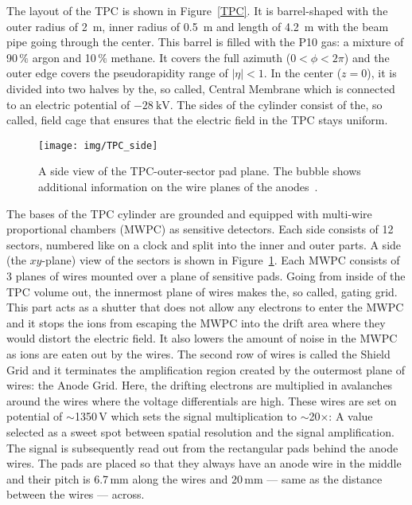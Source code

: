 The layout of the TPC is shown in Figure~\ref{TPC}. It is barrel-shaped with the outer radius of \SI{2}{\metre}, inner radius of \SI{0.5}{\metre} and length of \SI{4.2}{\metre}
with the beam pipe going through the center. This barrel is filled with the P10 gas: a mixture of 90$\,\%$ argon and 10$\,\%$ methane. It covers the full azimuth ($0 < \phi < 2\pi$) and the outer edge covers the
pseudorapidity range of $|\eta| < 1$. 
In the center ($z = 0$), it is divided into two halves by the, so called, Central Membrane which is connected to an electric 
potential of $-\SI{28}{\kilo\volt}$\@.  The sides of the cylinder consist of the, so called, field cage that ensures that the electric field in the TPC stays uniform.

\begin{figure}[htb]
\begin{center}
 \texttt{[image: img/TPC\_side]}\\
\end{center}
\caption{\label{TPCside}A side view of the TPC-outer-sector pad plane. The bubble shows additional information on the wire planes of the anodes~\cite{TpcNim}.}
\end{figure}

The bases of the TPC cylinder are grounded and equipped with multi-wire proportional chambers
(MWPC) as sensitive detectors. Each side consists of 12 sectors, numbered like on a clock and split into 
the inner and outer parts. A side (the $xy$-plane) view of the sectors is shown in Figure~\ref{TPCside}\@. Each MWPC consists of 3 planes of wires mounted over a plane of sensitive pads. Going from inside of the TPC volume out, the innermost plane of wires makes the, so called, gating grid. This part acts as a shutter that does not allow any electrons to enter the MWPC and it stops the ions from escaping the MWPC into the drift area where they would distort the electric field. It also lowers the amount of noise in the MWPC as ions are eaten out by the wires. The second row of wires is called the Shield Grid and it terminates the amplification region created by the outermost plane of wires: the Anode Grid. Here, the drifting electrons are multiplied in avalanches around the wires where the voltage differentials are high. These wires are set on potential of $\sim$1350$\,$V which sets the signal multiplication to $\sim$20$\times$\@: A value selected as a sweet spot between spatial resolution and the signal amplification. The signal is subsequently read out from the rectangular pads behind the anode wires. The pads are placed so that they always have an anode wire in the middle and their pitch is 6.7$\,$mm along the wires and 20$\,$mm --- same as the distance between the wires --- across. 

